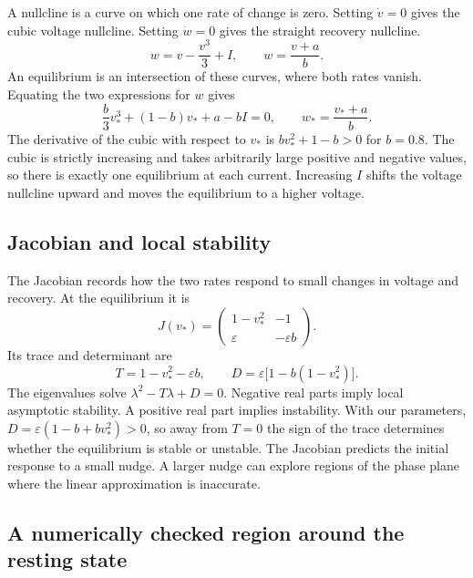 \documentclass[11pt,a4paper]{article}
\begin{document}
A nullcline is a curve on which one rate of change is zero. Setting \(\dot v=0\) gives the cubic voltage nullcline. Setting \(\dot w=0\) gives the straight recovery nullcline.
\begin{equation}
  w=v-\frac{v^3}{3}+I,
  \qquad
  w=\frac{v+a}{b}.
  \label{eq:nullclines}
\end{equation}
An equilibrium is an intersection of these curves, where both rates vanish. Equating the two expressions for \(w\) gives
\begin{equation}
  \frac{b}{3}v_*^3+(1-b)v_*+a-bI=0,
  \qquad
  w_*=\frac{v_*+a}{b}.
  \label{eq:equilibrium}
\end{equation}
The derivative of the cubic with respect to \(v_*\) is \(bv_*^2+1-b>0\) for \(b=0.8\). The cubic is strictly increasing and takes arbitrarily large positive and negative values, so there is exactly one equilibrium at each current. Increasing \(I\) shifts the voltage nullcline upward and moves the equilibrium to a higher voltage.

\subsection{Jacobian and local stability}

The Jacobian records how the two rates respond to small changes in voltage and recovery. At the equilibrium it is
\begin{equation}
  J(v_*)=
  \begin{pmatrix}
    1-v_*^2 & -1\\
    \varepsilon & -\varepsilon b
  \end{pmatrix}.
\end{equation}
Its trace and determinant are
\begin{equation}
  T=1-v_*^2-\varepsilon b,
  \qquad
  D=\varepsilon\bigl[1-b(1-v_*^2)\bigr].
  \label{eq:trace-det}
\end{equation}
The eigenvalues solve \(\lambda^2-T\lambda+D=0\). Negative real parts imply local asymptotic stability. A positive real part implies instability. With our parameters, \(D=\varepsilon(1-b+bv_*^2)>0\), so away from \(T=0\) the sign of the trace determines whether the equilibrium is stable or unstable. The Jacobian predicts the initial response to a small nudge. A larger nudge can explore regions of the phase plane where the linear approximation is inaccurate.

\subsection{A numerically checked region around the resting state}
\label{sec:lyapunov}
\end{document}
